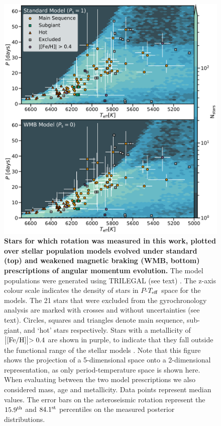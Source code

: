 \documentclass[12pt]{article}
\newcommand{\teff}{\mbox{$T_{\rm eff}$}\xspace}
\newcommand{\feh}{\mbox{$\rm{[Fe/H]}$}\xspace}
\newcommand{\rtwo}[1]{{#1}}
\begin{document}
\begin{figure}
	\centering
	\includegraphics[width=.9\textwidth]{fullsample_Fig3.pdf}
	\caption{\textbf{Stars for which rotation was measured in this work, plotted over stellar population models evolved under standard (top) and weakened magnetic braking (WMB, bottom) prescriptions of angular momentum evolution.} The model populations were generated using TRILEGAL (see text) \cite{girardi+2012}. \rtwo{The z-axis colour scale indicates the density of stars in $P$-\teff space for the models.} The 21 stars that were excluded from the gyrochronology analysis are marked with crosses and without uncertainties (see text). Circles, squares and triangles denote main sequence, sub-giant, and `hot' stars respectively. Stars with a metallicity of $\bigl\lvert \feh \bigl\rvert > 0.4$ are shown in purple, to indicate that they fall outside the functional range of the stellar models  \cite{vansaders+2019}. Note that this figure shows the projection of a 5-dimensional space onto a 2-dimensional representation, as only period-temperature space is shown here. When evaluating between the two model prescriptions we also considered mass, age and metallicity. Data points represent median values. The error bars on the asteroseismic rotation represent the $15.9^{\rm th}$ and $84.1^{\rm st}$ percentiles on the measured posterior distributions.}
	\label{fig:fullsample}
\end{figure}
\end{document}
